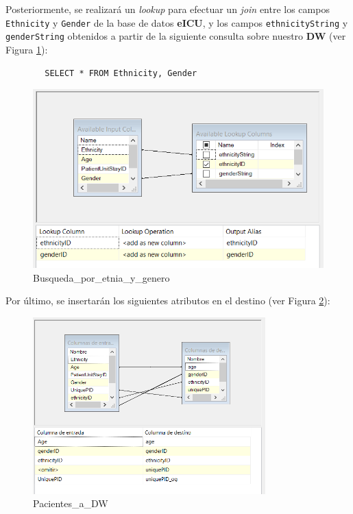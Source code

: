 \documentclass[12pt, a4paper, twoside]{article}
\begin{document}
	Posteriormente, se realizará un \textit{lookup} para efectuar un \textit{join} entre los campos \texttt{Ethnicity} y \texttt{Gender} de la base de datos \textbf{eICU}, y los campos \texttt{ethnicityString} y \texttt{genderString} obtenidos a partir de la siguiente consulta sobre nuestro \textbf{DW} (ver Figura \ref{fig:25}):
	
	\begin{verbatim}
		SELECT * FROM Ethnicity, Gender
	\end{verbatim}
	
	
	\begin{figure}[H]
		\centering
		\includegraphics[width=1\textwidth]{image/108_carga_paciente_lookup.png}
		\caption{Busqueda\_por\_etnia\_y\_genero}
		\label{fig:25}
	\end{figure}

	
	Por último, se insertarán los siguientes atributos en el destino (ver Figura \ref{fig:27}):
	
	\begin{figure}[H]
		\centering
		\includegraphics[width=0.8\textwidth]{image/108_carga_paciente_destino.png}
		\caption{Pacientes\_a\_DW}
		\label{fig:27}
	\end{figure}
\end{document}

